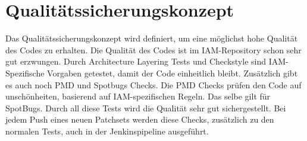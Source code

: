 \section{Qualitätssicherungskonzept}
Das Qualitätssicherungskonzept wird definiert, um eine möglichst hohe Qualität des Codes zu erhalten.
\newline
Die Qualität des Codes ist im IAM-Repository schon sehr gut erzwungen. Durch Architecture Layering Tests und Checkstyle sind IAM-Spezifische Vorgaben getestet, damit der Code einheitlich bleibt. Zusätzlich gibt es auch noch PMD und Spotbugs Checks. Die PMD Checks prüfen den Code auf unschönheiten, basierend auf IAM-spezifischen Regeln. Das selbe gilt für SpotBugs.
\newline
Durch all diese Tests wird die Qualität sehr gut sichergestellt. Bei jedem Push eines neuen Patchsets werden diese Checks, zusätzlich zu den normalen Tests, auch in der Jenkinspipeline ausgeführt.







